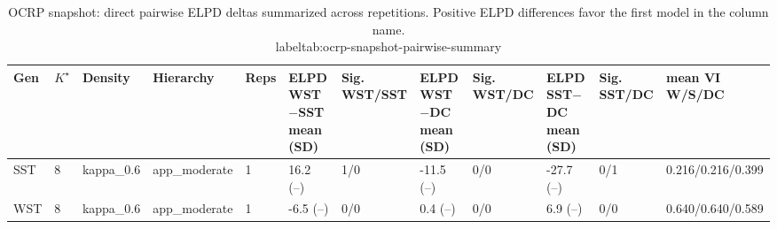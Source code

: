 \begin{table}[!h]
\centering
\caption{OCRP snapshot: direct pairwise ELPD deltas summarized across repetitions. Positive ELPD differences favor the first model in the column name.\\label{tab:ocrp-snapshot-pairwise-summary}}
\centering
\begin{tabular}[t]{llllllllllll}
\toprule
Gen & $K^\star$ & Density & Hierarchy & Reps & ELPD WST$-$SST mean (SD) & Sig. WST/SST & ELPD WST$-$DC mean (SD) & Sig. WST/DC & ELPD SST$-$DC mean (SD) & Sig. SST/DC & mean VI W/S/DC\\
\midrule
SST & 8 & kappa_0.6 & app_moderate & 1 & 16.2 (--) & 1/0 & -11.5 (--) & 0/0 & -27.7 (--) & 0/1 & 0.216/0.216/0.399\\
WST & 8 & kappa_0.6 & app_moderate & 1 & -6.5 (--) & 0/0 & 0.4 (--) & 0/0 & 6.9 (--) & 0/0 & 0.640/0.640/0.589\\
\bottomrule
\end{tabular}
\end{table}
